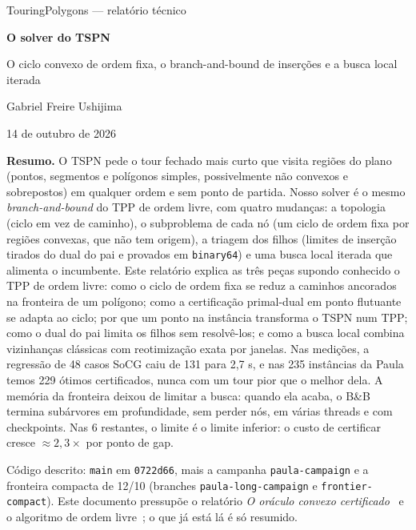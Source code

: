 \documentclass[11pt,a4paper]{article}
\theoremstyle{plain}\newtheorem{proposicao}{Proposição}
\theoremstyle{definition}\newtheorem{definicao}{Definição}
\theoremstyle{plain}\newtheorem{teorema}{Teorema}
\theoremstyle{plain}\newtheorem{lema}{Lema}
\newcommand{\code}[1]{\texttt{\small #1}}
\begin{document}

\begin{titlepage}
\vspace*{18mm}
{\color{quiet}\sffamily\small TouringPolygons --- relatório técnico\par}
\vspace{6mm}
{\color{navy}\bfseries\fontsize{24}{29}\selectfont O solver do TSPN\par}
\vspace{3mm}
{\color{good}\Large O ciclo convexo de ordem fixa, o branch-and-bound de inserções e a busca local iterada\par}
\vspace{10mm}
{\large Gabriel Freire Ushijima\par}
{\color{quiet}14 de outubro de 2026\par}
\vspace{14mm}
\begin{tcolorbox}[colback=navy!3,colframe=navy!40,boxrule=.5pt,arc=2pt,left=8pt,right=8pt,top=6pt,bottom=6pt]
\textbf{Resumo.} O TSPN pede o tour fechado mais curto que visita regiões do plano (pontos, segmentos e polígonos simples, possivelmente não convexos e sobrepostos) em qualquer ordem e sem ponto de partida. Nosso solver é o mesmo \emph{branch-and-bound} do TPP de ordem livre, com quatro mudanças: a topologia (ciclo em vez de caminho), o subproblema de cada nó (um ciclo de ordem fixa por regiões convexas, que não tem origem), a triagem dos filhos (limites de inserção tirados do dual do pai e provados em \texttt{binary64}) e uma busca local iterada que alimenta o incumbente. Este relatório explica as três peças supondo conhecido o TPP de ordem livre: como o ciclo de ordem fixa se reduz a caminhos ancorados na fronteira de um polígono; como a certificação primal-dual em ponto flutuante se adapta ao ciclo; por que um ponto na instância transforma o TSPN num TPP; como o dual do pai limita os filhos sem resolvê-los; e como a busca local combina vizinhanças clássicas com reotimização exata por janelas. Nas medições, a regressão de 48 casos SoCG caiu de 131 para 2,7 s, e nas 235 instâncias da Paula temos 229 ótimos certificados, nunca com um tour pior que o melhor dela. A memória da fronteira deixou de limitar a busca: quando ela acaba, o B\&B termina subárvores em profundidade, sem perder nós, em várias threads e com checkpoints. Nas 6 restantes, o limite é o limite inferior: o custo de certificar cresce \(\approx 2{,}3\times\) por ponto de gap.
\end{tcolorbox}
\vfill
{\small\color{quiet}Código descrito: \code{main} em \code{0722d66}, mais a campanha \code{paula-campaign} e a fronteira compacta de 12/10 (branches \code{paula-long-campaign} e \code{frontier-compact}). Este documento pressupõe o relatório \emph{O oráculo convexo certificado}~\cite{oraculo} e o algoritmo de ordem livre~\cite{ordemlivre}; o que já está lá é só resumido.\par}
\end{titlepage}
\end{document}
